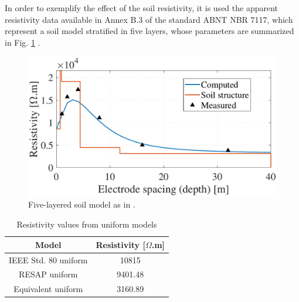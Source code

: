 \documentclass[conference]{IEEEtran}
\begin{document}

In order to exemplify the effect of the soil resistivity, it is used the apparent resistivity data available in Annex B.3 of the standard ABNT NBR 7117, which represent a soil model stratified in five layers, whose parameters are summarized in Fig. \ref{fig:SoilModel} \cite{NBR7117}.

\begin{figure}[hbt]
	\begin{center}
		\includegraphics[width=.8\columnwidth]{fig/soilmodel.pdf}
		\caption{Five-layered soil model as in \cite{NBR7117}.}
		\label{fig:SoilModel}
	\end{center}
\end{figure}


\begin{table}[!hbt]
	\renewcommand{\arraystretch}{1.3}
	\caption{Resistivity values from uniform models}
	\label{table:ResistivityValues}
	\centering
	\begin{tabular}{|c|c|}
		\hline
		\textbf{Model} & \textbf{Resistivity [$\Omega$.m]} \\
		\hline
		IEEE Std. 80 uniform & 10815\\
		\hline
		RESAP uniform & 9401.48\\
		\hline
		Equivalent uniform & 3160.89\\
		\hline
	\end{tabular}
\end{table}
\end{document}
